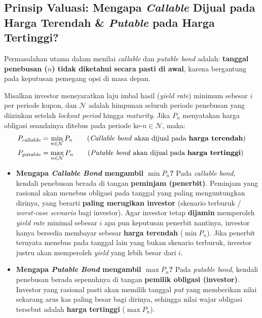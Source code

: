 \documentclass[11pt,a4paper]{article}
\begin{document}
\subsection{Prinsip Valuasi: Mengapa \textit{Callable} Dijual pada Harga Terendah \& \textit{Putable} pada Harga Tertinggi?}

Permasalahan utama dalam menilai \textit{callable} dan \textit{putable bond} adalah: \textbf{tanggal penebusan ($n$) tidak diketahui secara pasti di awal}, karena bergantung pada keputusan pemegang opsi di masa depan.

\begin{theorembox}
Misalkan investor mensyaratkan laju imbal hasil (\textit{yield rate}) minimum sebesar $i$ per periode kupon, dan $\mathcal{N}$ adalah himpunan seluruh periode penebusan yang diizinkan setelah \textit{lockout period} hingga \textit{maturity}. Jika $P_n$ menyatakan harga obligasi seandainya ditebus pada periode ke-$n \in \mathcal{N}$, maka:
\begin{align}
    P_{\text{callable}} &= \min_{n \in \mathcal{N}} P_n \qquad \text{(\textit{Callable bond} akan dijual pada \textbf{harga terendah})} \\
    P_{\text{putable}}  &= \max_{n \in \mathcal{N}} P_n \qquad \text{(\textit{Putable bond} akan dijual pada \textbf{harga tertinggi})}
\end{align}
\end{theorembox}

\begin{notebox}
\begin{itemize}[leftmargin=1.5em]
    \item \textbf{Mengapa \textit{Callable Bond} mengambil $\min P_n$?}
    Pada \textit{callable bond}, kendali penebusan berada di tangan \textbf{peminjam (penerbit)}. Peminjam yang rasional akan menebus obligasi pada tanggal yang paling menguntungkan dirinya, yang berarti \textbf{paling merugikan investor} (skenario terburuk / \textit{worst-case scenario} bagi investor). Agar investor tetap \textbf{dijamin} memperoleh \textit{yield rate} minimal sebesar $i$ apa pun keputusan penerbit nantinya, investor hanya bersedia membayar sebesar \textbf{harga terendah} ($\min P_n$). Jika penerbit ternyata menebus pada tanggal lain yang bukan skenario terburuk, investor justru akan memperoleh \textit{yield} yang lebih besar dari $i$.
    \item \textbf{Mengapa \textit{Putable Bond} mengambil $\max P_n$?}
    Pada \textit{putable bond}, kendali penebusan berada sepenuhnya di tangan \textbf{pemilik obligasi (investor)}. Investor yang rasional pasti akan memilih tanggal \textit{put} yang memberikan nilai sekarang arus kas paling besar bagi dirinya, sehingga nilai wajar obligasi tersebut adalah \textbf{harga tertinggi} ($\max P_n$).
\end{itemize}
\end{notebox}
\end{document}
